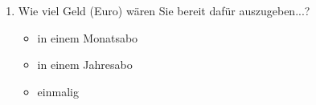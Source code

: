 \begin{enumerate}[resume]
\item Wie viel Geld (Euro) wären Sie bereit dafür auszugeben...?\label{App3:Geld}

      \begin{itemize}
           \item[\Circle] in einem Monatsabo\\ \underline{\hspace{3cm}}
           \item[\Circle] in einem Jahresabo\\ \underline{\hspace{3cm}}
           \item[\Circle] einmalig\\ \underline{\hspace{3cm}}
       \end{itemize}

\end{enumerate}

